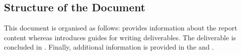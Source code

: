 \subsection{Structure of the Document}
\label{sec:structure}

This document is organised as follows:  provides information about the report content whereas  introduces guides for writing \projacronym{} deliverables. The deliverable is concluded in . Finally, additional information is provided in the  and .

